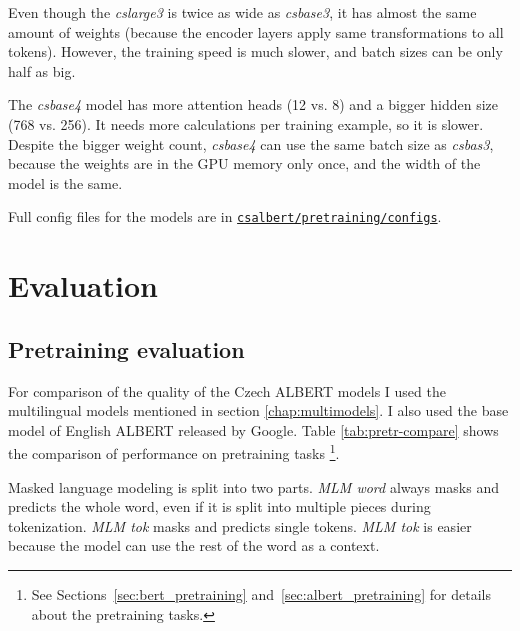 \documentclass[
  printed, %
  color,   %
  table,   %
  oneside, %
  lof,     %
  lot,     %
]{fithesis3}
\begin{document}

Even though the \textit{cslarge3} is twice as wide as \textit{csbase3}, it has almost the same amount of weights (because the encoder layers apply same transformations to all tokens). However, the training speed is much slower, and batch sizes can be only half as big.

The \textit{csbase4} model has more attention heads (12 vs. 8) and a bigger hidden size (768 vs. 256). It needs more calculations per training example, so it is slower. Despite the bigger weight count, \textit{csbase4} can use the same batch size as \textit{csbas3}, because the weights are in the GPU memory only once, and the width of the model is the same.


Full config files for the models are in 
\href{https://github.com/ZepZep/csalbert/blob/master/pretraining/configs} {\texttt{csalbert/pretraining/\linebreak{}configs}}.







\chapter{Evaluation}
\label{sec:eval}
\section{Pretraining evaluation}
\label{sec:pretr_eval}
For comparison of the quality of the Czech ALBERT models I used the multilingual models mentioned in section \ref{chap:multimodels}. I also used the base model of English ALBERT released by Google.
Table \ref{tab:pretr-compare} shows the comparison of performance on pretraining tasks 
\footnote{See Sections~\ref{sec:bert_pretraining} and~\ref{sec:albert_pretraining} for details about the pretraining tasks.}.

Masked language modeling is split into two parts. \textit{MLM word} always masks and predicts the whole word, even if it is split into multiple pieces during tokenization. \textit{MLM tok} masks and predicts single tokens. \textit{MLM tok} is easier because the model can use the rest of the word as a context.
\end{document}

